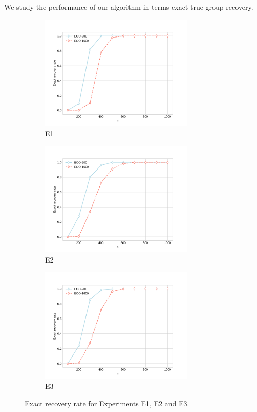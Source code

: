 \documentclass[11pt]{article}
\begin{document}
    We study the performance of our algorithm in terms exact true group recovery. 
    
    \begin{figure}[!htp]
    \label{exact_recov_rate}
                \begin{subfigure}{.33\textwidth}
                  \centering
                  \includegraphics[width=.9\linewidth,height=5.5cm]{figure/exact_recov_rate_model_1.pdf}
                  \caption{E1}
                  \label{fig:sfig1_chap2}
                \end{subfigure}%
                \begin{subfigure}{.33\textwidth}
                  \centering
                  \includegraphics[width=.9\linewidth,height=5.5cm]{figure/exact_recov_rate_model_2.pdf}
                  \caption{E2}
                  \label{fig:sfig2_chap2}
                \end{subfigure}
                \begin{subfigure}{.33\textwidth}
                  \centering
                  \includegraphics[width=.9\linewidth,height=5.5cm]{figure/exact_recov_rate_model_3.pdf}
                  \caption{E3}
                  \label{fig:sfig3_chap2}
                \end{subfigure}%
                \hspace{\fill}
    	\caption{Exact recovery rate for Experiments E1, E2 and E3. }
	\end{figure}
	
\end{document}
